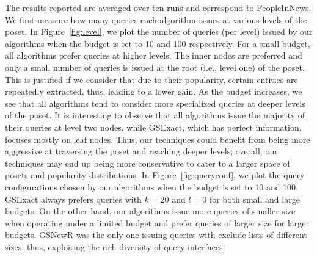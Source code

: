 The results reported are averaged over ten runs and correspond to PeopleInNews. We first measure how many queries each algorithm issues at various levels of the poset. In Figure~\ref{fig:level}, we plot the number of queries (per level) issued by our algorithms when the budget is set to 10 and 100 respectively. For a small budget, all algorithms prefer queries at higher levels. The inner nodes are preferred and only a small number of queries is issued at the root (i.e., level one) of the poset. This is justified if we consider that due to their popularity, certain entities are repeatedly extracted, thus, leading to a lower gain. As the budget increases, we see that all algorithms tend to consider more specialized queries at deeper levels of the poset. It is interesting to observe that all algorithms issue the majority of their queries at level two nodes, while GSExact, which has perfect information, focuses mostly on leaf nodes. Thus, our techniques could benefit from being more aggressive at traversing the poset and reaching deeper levels; overall, our techniques may end up being more conservative to cater to a larger space of posets and popularity distributions. In Figure~\ref{fig:queryconf}, we plot the query configurations chosen by our algorithms when the budget is set to 10 and 100. GSExact always prefers queries with $k = 20$ and $l = 0$ for both small and large budgets. On the other hand, our algorithms issue more queries of smaller size when operating under a limited budget and prefer queries of larger size for larger budgets. GSNewR was the only one issuing queries with exclude lists of different sizes, thus, exploiting the rich diversity of query interfaces.


